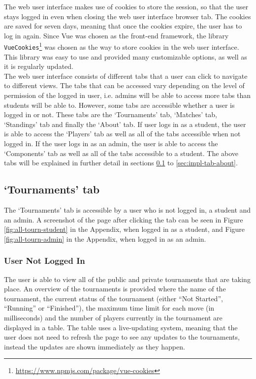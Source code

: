 \documentclass[a4paper, 11pt]{report}
\begin{document}
The web user interface makes use of cookies to store the session, so that the
user stays logged in even when closing the web user interface browser tab. The
cookies are saved for seven days, meaning that once the cookies expire, the
user has to log in again. Since Vue was chosen as the front-end framework, the
library \texttt{VueCookies}\footnote{\url{https://www.npmjs.com/package/vue-cookies}}
was chosen as the way to store cookies in the web user interface. This library
was easy to use and provided many customizable options, as well as it is
regularly updated. \\

The web user interface consists of different tabs that a user can click to navigate
to different views. The tabs that can be accessed vary depending on the level of
permission of the logged in user, i.e. admins will be able to access more tabs
than students will be able to. However, some tabs are accessible whether a user
is logged in or not. These tabs are the `Tournaments' tab, `Matches' tab,
`Standings' tab and finally the `About' tab. If user logs in as a student, the
user is able to access the `Players' tab as well as all of the tabs accessible
when not logged in. If the user logs in as an admin, the user is able to access
the `Components' tab as well as all of the tabs accessible to a student. The
above tabs will be explained in further detail in sections
\ref{sec:impl-tab-tournaments} to \ref{sec:impl-tab-about}.

\subsection{`Tournaments' tab}
\label{sec:impl-tab-tournaments}

The `Tournaments' tab is accessible by a user who is not logged in, a student
and an admin. A screenshot of the page after clicking the tab can be seen in
Figure \ref{fig:all-tourn-student} in the Appendix, when logged in as a student,
and Figure \ref{fig:all-tourn-admin} in the Appendix, when logged in as an
admin.

\subsubsection*{User Not Logged In}

The user is able to view all of the public and private tournaments that are
taking place. An overview of the tournaments is provided where the name of the
tournament, the current status of the tournament (either ``Not Started'',
``Running'' or ``Finished''), the maximum time limit for each move (in milliseconds)
and the number of players currently in the tournament are displayed in a table.
The table uses a live-updating system, meaning that the user does not need to
refresh the page to see any updates to the tournaments, instead the updates are
shown immediately as they happen. \\
\end{document}
